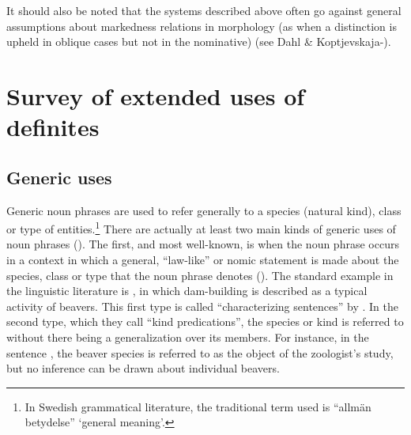 It should also be noted that the systems described above often go against general assumptions about markedness relations in morphology (as when a distinction is upheld in oblique cases but not in the nominative) (see Dahl \& Koptjevskaja-\citet{Tamm2006}).

\section{ Survey of extended uses of definites}
\label{bkm:Ref105226591}\subsection{ Generic uses}
\label{bkm:Ref154983693}

Generic noun phrases are used to refer generally to a species (natural kind), class or type of entities.\footnote{ In Swedish grammatical literature, the traditional term used is “allmän betydelse” ‘general meaning’.} There are actually at least two main kinds of generic uses of noun phrases (\citet[19]{KrifkaEtAl1995}). The first, and most well-known, is when the noun phrase occurs in a context in which a general, “law-like” or nomic statement is made about the species, class or type that the noun phrase denotes (\citet{Dahl1973}). The\textbf{ }standard example in the linguistic literature is , in which dam-building is described as a typical activity of beavers. This first type is called “characterizing sentences” by \citet{KrifkaEtAl1995}. In the second type, which they call “kind predications”, the species or kind is referred to without there being a generalization over its members. For instance, in the sentence , the beaver species is referred to as the object of the zoologist’s study, but no inference can be drawn about individual beavers.

